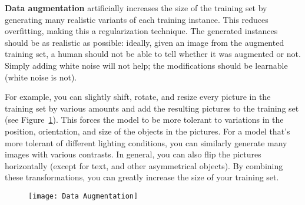 \textbf{Data augmentation} artificially increases the size of the training set by generating many realistic variants of each training instance. This reduces overfitting, making this a regularization technique. The generated instances should be as realistic as possible: ideally, given an image from the augmented training set, a human should not be able to tell whether it was augmented or not. Simply adding white noise will not help; the modifications should be learnable (white noise is not).

For example, you can slightly shift, rotate, and resize every picture in the training set by various amounts and add the resulting pictures to the training set (see Figure~\ref{Data_Augmentation}). This forces the model to be more tolerant to variations in the position, orientation, and size of the objects in the pictures. For a model that's more tolerant of different lighting conditions, you can similarly generate many images with various contrasts. In general, you can also flip the pictures horizontally (except for text, and other asymmetrical objects). By combining these transformations, you can greatly increase the size of your training set.
\begin{figure}[!ht]
\centering
\texttt{[image: Data Augmentation]}
\caption{}\label{Data_Augmentation}
\end{figure}
